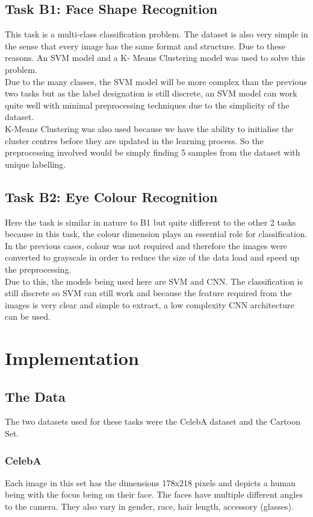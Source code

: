 \documentclass{article}
\begin{document}
    \subsection{Task B1: Face Shape Recognition}
    This task is a multi-class classification problem. The dataset is also very simple in the sense that every image has the same format and structure. Due to these reasons. An SVM model and a K- Means Clustering model was used to solve this problem.\\
    
     Due to the many classes, the SVM model will be more complex than the previous two tasks but as the label designation is still discrete, an SVM model can work quite well with minimal preprocessing techniques due to the simplicity of the dataset.\\
    
     K-Means Clustering was also used because we have the ability to initialise the cluster centres before they are updated in the learning process. So the preprocessing involved would be simply finding 5 samples from the dataset with unique labelling. 
    \subsection{Task B2: Eye Colour Recognition}
    Here the task is similar in nature to B1 but quite different to the other 2 tasks because in this task, the colour dimension plays an essential role for classification. In the previous cases, colour was not required and therefore the images were converted to grayscale in order to reduce the size of the data load and speed up the preprocessing. \\
    
    Due to this, the models being used here are SVM and CNN. The classification is still discrete so SVM can still work and because the feature required from the images is very clear and simple to extract, a low complexity CNN architecture can be used.

\section{Implementation}
\label{sec:impl}
	\subsection{The Data}
	The two datasets used for these tasks were the CelebA dataset and the Cartoon Set.
	\subsubsection{CelebA}
	Each image in this set has the dimensions 178x218 pixels and depicts a human being with the focus being on their face. The faces have multiple different angles to the camera. They also vary in gender, race, hair length, accessory (glasses). 
\end{document}
